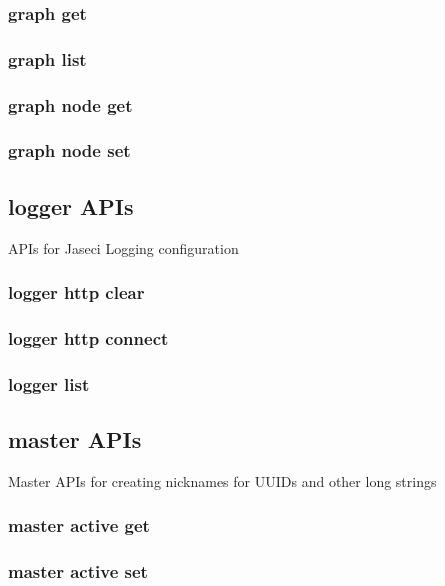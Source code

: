 \subsubsection{graph get}

\subsubsection{graph list}

\subsubsection{graph node get}

\subsubsection{graph node set}

\subsection{logger APIs}

APIs for Jaseci Logging configuration

\subsubsection{logger http clear}

\subsubsection{logger http connect}

\subsubsection{logger list}

\subsection{master APIs}

Master APIs for creating nicknames for UUIDs and other long strings
\par
    

\subsubsection{master active get}

\subsubsection{master active set}

